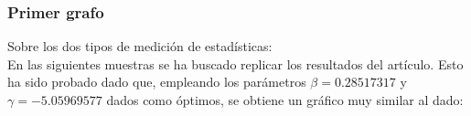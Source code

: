 \documentclass{article}
\begin{document}
\subsubsection{Primer grafo}

Sobre los dos tipos de medición de estadísticas: \\
En las siguientes muestras se ha buscado replicar los resultados del artículo. Esto ha sido probado dado que, empleando los parámetros \(\beta = 0.28517317\) y \(\gamma = -5.05969577 \) dados como óptimos, se obtiene un gráfico muy similar al dado: \\

\begin{figure}[htbp]
  \centering
  \caption{} \label{fig:primer_grafo/sin_restriccion_extra/primer_paper_aer_resultado}
\end{figure}


\end{document}
